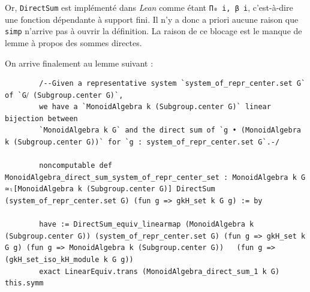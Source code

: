 \documentclass[10pt]{article}
\theoremstyle{definition}
\begin{document}
Or, \lstinline|DirectSum| est implémenté dans \textit{Lean} comme étant \lstinline|Π₀ i, β i|, c'est-à-dire une fonction dépendante à support fini. Il n'y a donc a priori aucune raison que \lstinline|simp| n'arrive pas à ouvrir la définition. La raison de ce blocage est le manque de lemme à propos des sommes directes.

On arrive finalement au lemme suivant : 
\begin{center}
	\begin{tcolorbox}[title = $L\exists\forall N$,width=12cm,text width=14cm,colback=lightgray!30,
		colframe=gray,sharp corners,
		rounded corners=uphill ]
		\begin{lstlisting}
		/--Given a representative system `system_of_repr_center.set G` of `G⧸ (Subgroup.center G)`,
		we have a `MonoidAlgebra k (Subgroup.center G)` linear bijection between
		`MonoidAlgebra k G` and the direct sum of `g • (MonoidAlgebra k (Subgroup.center G))` for `g : system_of_repr_center.set G`.-/
		
		noncomputable def MonoidAlgebra_direct_sum_system_of_repr_center_set : MonoidAlgebra k G ≃ₗ[MonoidAlgebra k (Subgroup.center G)] DirectSum (system_of_repr_center.set G) (fun g => gkH_set k G g) := by
		
		have := DirectSum_equiv_linearmap (MonoidAlgebra k (Subgroup.center G)) (system_of_repr_center.set G) (fun g => gkH_set k G g) (fun g => MonoidAlgebra k (Subgroup.center G)) 	(fun g => (gkH_set_iso_kH_module k G g))
		exact LinearEquiv.trans (MonoidAlgebra_direct_sum_1 k G) this.symm
		\end{lstlisting}
	\end{tcolorbox}
\end{center}
\end{document}

